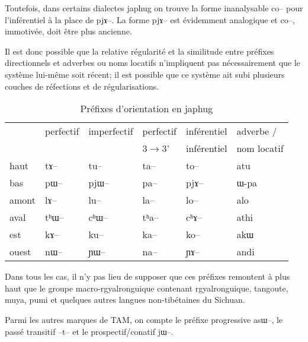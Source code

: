 \documentclass[oldfontcommands,oneside,a4paper,11pt]{article}
\newcommand{\ipa}[1]{{\phon \mbox{#1}}} %
\begin{document}
Toutefois, dans certains dialectes japhug on trouve la forme inanalysable \ipa{co--} pour l'inférentiel à la place de \ipa{pjɤ--}. La forme \ipa{pjɤ--} est évidemment analogique et \ipa{co--}, immotivée, doit être plus ancienne.

Il est donc possible que la relative régularité et la similitude entre préfixes directionnels et adverbes ou noms locatifs n'impliquent pas nécessairement que le système lui-même soit récent; il est possible que ce système ait subi plusieurs couches de réfections et de régularisations. 

\begin{table}[H]
\caption{Préfixes d'orientation en japhug} \label{tab:orientation}
\begin{tabular}{llllll}
\toprule
   &  	perfectif &  	imperfectif  &  	perfectif   &  	inférentiel  & adverbe / \\  	
  &  	  &  	   &  	  3$\rightarrow$3'  &  	inférentiel  & nom locatif\\  	
   \midrule
haut   &  	\ipa{tɤ--}   &  	\ipa{tu--}   &  	\ipa{ta--}   &  	\ipa{to--}  & \ipa{atu} \\  	
bas   &  	\ipa{pɯ--}   &  	\ipa{pjɯ--}   &  	\ipa{pa--}   &  	\ipa{pjɤ--}  &\ipa{ɯ-pa} \\  	
amont   &  	\ipa{lɤ--}   &  	\ipa{lu--}   &  	\ipa{la--}   &  	\ipa{lo--}  & \ipa{alo}  \\  	
aval   &  	\ipa{tʰɯ--}   &  	\ipa{cʰɯ--}   &  	\ipa{tʰa--}   &  	\ipa{cʰɤ--} & \ipa{athi}  \\  	
est   &  	\ipa{kɤ--}   &  	\ipa{ku--}   &  	\ipa{ka--}   &  	\ipa{ko--}  & \ipa{akɯ}  \\  	
ouest   &  	\ipa{nɯ--}   &  	\ipa{ɲɯ--}   &  	\ipa{na--}   &  	\ipa{ɲɤ--}  & \ipa{andi}  \\  	
\bottomrule
\end{tabular} 
\end{table}

Dans tous les cas, il n'y pas lieu de supposer que ces préfixes remontent à plus haut que le groupe macro-rgyalronguique contenant rgyalronguique, tangoute, muya, pumi et quelques autres langues non-tibétaines du Sichuan. 


Parmi les autres marques de TAM, on compte le préfixe progressive \ipa{asɯ--}, le passé transitif \ipa{--t--} et le prospectif/conatif \ipa{jɯ--}. 
\end{document}
